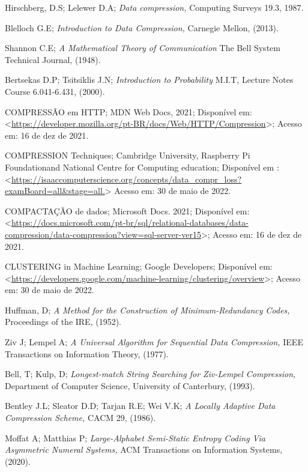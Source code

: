 \documentclass[
	12pt,					%
	openright,				%
	twoside,					%
	a4paper,					%
	english,					%
	brazil					%
	]{abntex2}
\begin{document}
\begin{thebibliography}{9} 
 Hirschberg, D.S; Lelewer D.A;
\emph{Data compression, }Computing Surveys 19.3, 1987.

Blelloch G.E;
\emph{Introduction to Data Compression, } Carnegie Mellon, (2013).

Shannon C.E;
\emph{A Mathematical Theory of Communication} The Bell System Technical Journal, (1948).

 Bertsekas D.P; Tsitsiklis  J.N;
\emph{Introduction to Probability} M.I.T, Lecture Notes Course 6.041-6.431, (2000).

COMPRESSÃO em HTTP; 
MDN Web Docs, 2021; 
Disponível em: <\url{https://developer.mozilla.org/pt-BR/docs/Web/HTTP/Compression}>; Acesso em: 16 de dez de 2021.

COMPRESSION Techniques; 
Cambridge University, Raspberry Pi Foundationand National Centre for Computing education;
 Disponível em : <\url{https://isaaccomputerscience.org/concepts/data_compr_loss?examBoard=all&stage=all.}> Acesso em: 30 de maio de 2022.
 
COMPACTAÇÃO de dados; 
Microsoft Docs. 2021; 
Disponível em: <\url{https://docs.microsoft.com/pt-br/sql/relational-databases/data-compression/data-compression?view=sql-server-ver15}>; Acesso em: 16 de dez de 2021.

CLUSTERING in Machine Learning; 
Google Developers; 
Disponível em:  <\url{https://developers.google.com/machine-learning/clustering/overview}>; Acesso em: 30 de maio de 2022.

 Huffman, D; 
\emph{A Method for the Construction of Minimum-Redundancy Codes, } Proceedings of the IRE, (1952).

 Ziv J; Lempel A;
\emph{A Universal Algorithm for Sequential Data Compression, } IEEE Transactions on Information Theory, (1977).

 Bell, T; Kulp, D;
\emph{Longest-match String Searching for Ziv-Lempel Compression, }  Department of Computer Science, University of Canterbury, (1993).

 Bentley J.L; Sleator D.D; Tarjan R.E; Wei V.K;
\emph{A Locally Adaptive Data Compression Scheme, }  CACM 29, (1986).


 Moffat A; Matthias P;
\emph{Large-Alphabet Semi-Static Entropy Coding Via Asymmetric Numeral Systems, } ACM Transactions on Information Systems, (2020).



\end{thebibliography}
\end{document}
